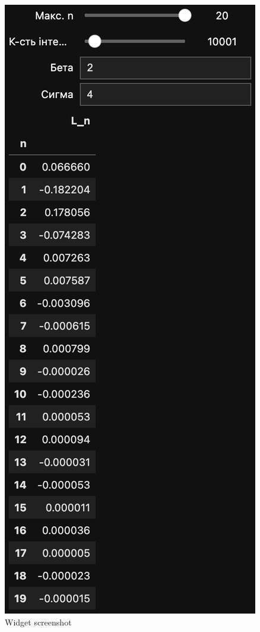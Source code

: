 \documentclass[11pt]{article}
\begin{document}
    \begin{figure}
\centering
\includegraphics{screenshots/4.png}
\caption{Widget screenshot}
\end{figure}
\newpage
\end{document}
